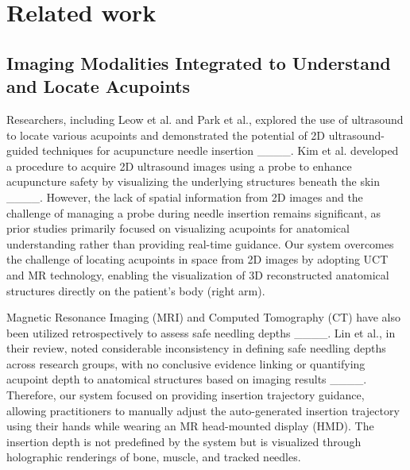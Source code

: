 \section{Related work}
\subsection{Imaging Modalities Integrated to Understand and Locate Acupoints}
Researchers, including Leow et al. and Park et al., explored the use of ultrasound to locate various acupoints and demonstrated the potential of 2D ultrasound-guided techniques for acupuncture needle insertion ____. Kim et al. developed a procedure to acquire 2D ultrasound images using a probe to enhance acupuncture safety by visualizing the underlying structures beneath the skin ____. However, the lack of spatial information from 2D images and the challenge of managing a probe during needle insertion remains significant, as prior studies primarily focused on visualizing acupoints for anatomical understanding rather than providing real-time guidance. Our system overcomes the challenge of locating acupoints in space from 2D images by adopting UCT and MR technology, enabling the visualization of 3D reconstructed anatomical structures directly on the patient’s body (right arm). 

Magnetic Resonance Imaging (MRI) and Computed Tomography (CT) have also been utilized retrospectively to assess safe needling depths ____. Lin et al., in their review, noted considerable inconsistency in defining safe needling depths across research groups, with no conclusive evidence linking or quantifying acupoint depth to anatomical structures based on imaging results ____. Therefore, our system focused on providing insertion trajectory guidance, allowing practitioners to manually adjust the auto-generated insertion trajectory using their hands while wearing an MR head-mounted display (HMD). The insertion depth is not predefined by the system but is visualized through holographic renderings of bone, muscle, and tracked needles.

\subsection{}

